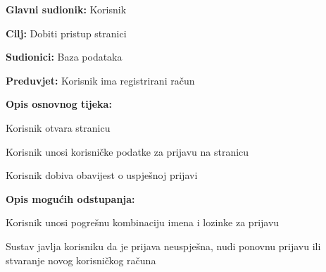 					\noindent {}
					\begin{packed_item}
				
				\item \textbf{Glavni sudionik: } Korisnik
				\item  \textbf{Cilj:} Dobiti pristup stranici
				\item  \textbf{Sudionici:} Baza podataka
				\item  \textbf{Preduvjet:} Korisnik ima registrirani račun
				\item  \textbf{Opis osnovnog tijeka:}
				
				\item[] \begin{packed_enum}
					
					\item Korisnik otvara stranicu
					\item Korisnik unosi korisničke podatke za prijavu na stranicu
					\item Korisnik dobiva obavijest o uspješnoj prijavi
				\end{packed_enum}
				
				\item  \textbf{Opis mogućih odstupanja:}
				
				\item[] \begin{packed_item}
					
					\item[2.a] Korisnik unosi pogrešnu kombinaciju imena i lozinke za prijavu
					\item[] \begin{packed_enum}
						
						\item Sustav javlja korisniku da je prijava neuspješna, nudi ponovnu prijavu ili stvaranje
						novog korisničkog računa
					\end{packed_enum}
					
					
				\end{packed_item}
			\end{packed_item}
			

